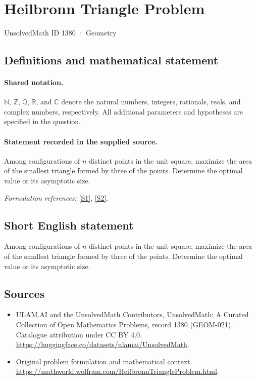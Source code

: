 \documentclass[11pt]{article}
\newcommand{\sref}[2]{\hyperlink{source:#1:#2}{[S#2]}}
\begin{document}
\setcounter{section}{1379}
\section{Heilbronn Triangle Problem}\label{1380}
{\small UnsolvedMath ID 1380 · Geometry}
\subsection{Definitions and mathematical statement}

\paragraph{Shared notation.}$\mathbb N$, $\mathbb Z$, $\mathbb Q$, $\mathbb R$, and $\mathbb C$ denote the natural numbers, integers, rationals, reals, and complex numbers, respectively. All additional parameters and hypotheses are specified in the question.


\paragraph{Statement recorded in the supplied source.}
Among configurations of $n$ distinct points in the unit square, maximize the area of the smallest triangle formed by three of the points. Determine the optimal value or its asymptotic size.
\par\smallskip\textit{Formulation references:} \sref{1380}{1}, \sref{1380}{2}.
\subsection{Short English statement}
Among configurations of $n$ distinct points in the unit square, maximize the area of the smallest triangle formed by three of the points. Determine the optimal value or its asymptotic size.
\subsection{Sources}
\begin{itemize}
\item[\hypertarget{source:1380:1}{S1}] ULAM.AI and the UnsolvedMath Contributors, UnsolvedMath: A Curated Collection of Open Mathematics Problems, record 1380 (GEOM-021). Catalogue attribution under CC BY 4.0.
\url{https://huggingface.co/datasets/ulamai/UnsolvedMath}.
\item[\hypertarget{source:1380:2}{S2}] Original problem formulation and mathematical context.
\url{https://mathworld.wolfram.com/HeilbronnTriangleProblem.html}.
\end{itemize}
\label{end:1380}
\end{document}

